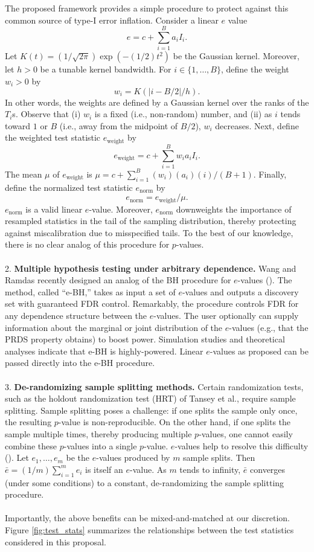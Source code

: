 \documentclass[12pt]{article}
\begin{document}
The proposed framework provides a simple procedure to protect against this common source of type-I error inflation. Consider a linear $e$ value
$$e = c + \sum_{i=1}^B a_i I_i.$$ Let $K(t) = (1/\sqrt{2\pi}) \exp( -(1/2)t^2)$ be the Gaussian kernel. Moreover, let $h > 0$ be a tunable kernel bandwidth. For $i \in \{1, \dots, B\}$, define the weight $w_i > 0$ by $$w_i = K(|i - B/2|/h).$$ In other words, the weights are defined by a Gaussian kernel over the ranks of the $T_i$s. Observe that (i) $w_i$ is a fixed (i.e., non-random) number, and (ii) as $i$ tends toward $1$ or $B$ (i.e., away from the midpoint of $B/2$), $w_i$ decreases. Next, define the weighted test statistic $e_\textrm{weight}$ by 
$$e_\textrm{weight} = c + \sum_{i=1}^B w_i a_i I_i.$$ The mean $\mu$ of $e_\textrm{weight}$ is $\mu = c + \sum_{i=1}^B (w_i)(a_i)(i)/(B+1).$ Finally, define the normalized test statistic $e_\textrm{norm}$ by
$$e_\textrm{norm} = e_\textrm{weight}/\mu.$$ $e_\textrm{norm}$ is a valid linear $e$-value. Moreover, $e_\textrm{norm}$ downweights the importance of resampled statistics in the tail of the sampling distribution, thereby protecting against miscalibration due to misspecified tails. To the best of our knowledge, there is no clear analog of this procedure for $p$-values.
\noindent \\ \\
2. \textbf{Multiple hypothesis testing under arbitrary dependence.} Wang and Ramdas recently designed an analog of the BH procedure for $e$-values (\cite{Wang2020b}). The method, called ``e-BH,'' takes as input a set of $e$-values and outputs a discovery set with guaranteed FDR control. Remarkably, the procedure controls FDR for any dependence structure between the $e$-values. The user optionally can supply information about the marginal or joint distribution of the $e$-values (e.g., that the PRDS property obtains) to boost power. Simulation studies and theoretical analyses indicate that e-BH is highly-powered. Linear $e$-values as proposed can be passed directly into the e-BH procedure.
\noindent \\ \\
3. \textbf{De-randomizing sample splitting methods.} Certain randomization tests, such as the holdout randomization test (HRT) of Tansey et al., require sample splitting. Sample splitting poses a challenge: if one splits the sample only once, the resulting $p$-value is non-reproducible. On the other hand, if one splits the sample multiple times, thereby producing multiple $p$-values, one cannot easily combine these $p$-values into a single $p$-value. $e$-values help to resolve this difficulty (\cite{Vovk2020}). Let $e_1, \dots, e_m$ be the $e$-values produced by $m$ sample splits. Then $\bar{e} = (1/m)\sum_{i=1}^m e_i$ is itself an $e$-value. As $m$ tends to infinity, $\bar{e}$ converges (under some conditions) to a constant, de-randomizing the sample splitting procedure.
\noindent \\ \\
Importantly, the above benefits can be mixed-and-matched at our discretion. Figure \ref{fig:test_stats} summarizes the relationships between the test statistics considered in this proposal.
\end{document}
